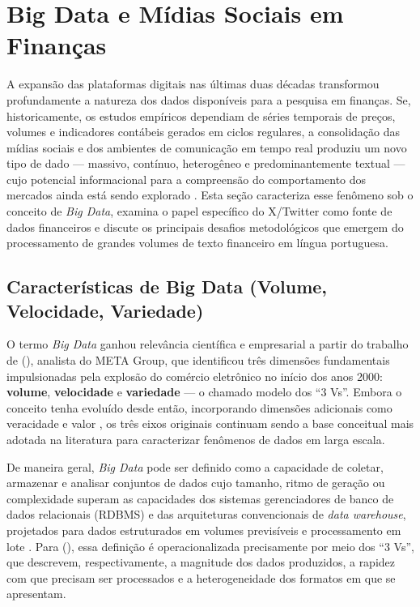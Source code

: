 \section{Big Data e Mídias Sociais em Finanças}
\label{sec:big_data_midias_sociais}

A expansão das plataformas digitais nas últimas duas décadas transformou profundamente a natureza dos dados disponíveis para a pesquisa em finanças. Se, historicamente, os estudos empíricos dependiam de séries temporais de preços, volumes e indicadores contábeis gerados em ciclos regulares, a consolidação das mídias sociais e dos ambientes de comunicação em tempo real produziu um novo tipo de dado --- massivo, contínuo, heterogêneo e predominantemente textual --- cujo potencial informacional para a compreensão do comportamento dos mercados ainda está sendo explorado \cite{kearney2014,chen2014bigdata}. Esta seção caracteriza esse fenômeno sob o conceito de \textit{Big Data}, examina o papel específico do X/Twitter como fonte de dados financeiros e discute os principais desafios metodológicos que emergem do processamento de grandes volumes de texto financeiro em língua portuguesa.


\subsection{Características de Big Data (Volume, Velocidade, Variedade)}
\label{subsec:big_data_caracteristicas}

O termo \textit{Big Data} ganhou relevância científica e empresarial a partir do trabalho de \citeauthor{laney2001} (\citeyear{laney2001}), analista do META Group, que identificou três dimensões fundamentais impulsionadas pela explosão do comércio eletrônico no início dos anos 2000: \textbf{volume}, \textbf{velocidade} e \textbf{variedade} --- o chamado modelo dos ``3 Vs''. Embora o conceito tenha evoluído desde então, incorporando dimensões adicionais como veracidade e valor \cite{chen2014bigdata}, os três eixos originais continuam sendo a base conceitual mais adotada na literatura para caracterizar fenômenos de dados em larga escala.

De maneira geral, \textit{Big Data} pode ser definido como a capacidade de coletar, armazenar e analisar conjuntos de dados cujo tamanho, ritmo de geração ou complexidade superam as capacidades dos sistemas gerenciadores de banco de dados relacionais (RDBMS) e das arquiteturas convencionais de \textit{data warehouse}, projetados para dados estruturados em volumes previsíveis e processamento em lote \cite{chen2014bigdata}. Para \citeauthor{chen2014bigdata} (\citeyear{chen2014bigdata}), essa definição é operacionalizada precisamente por meio dos ``3 Vs'', que descrevem, respectivamente, a magnitude dos dados produzidos, a rapidez com que precisam ser processados e a heterogeneidade dos formatos em que se apresentam.

